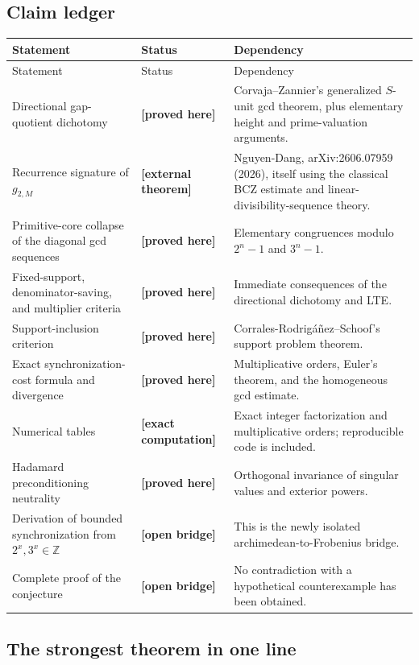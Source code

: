 \documentclass[11pt,oneside]{article}
\theoremstyle{definition}
\theoremstyle{remark}
\newcommand{\Z}{\mathbb Z}
\newcommand{\statusproved}{\textcolor{proofgreen}{\textbf{[proved here]}}}
\newcommand{\statusexternal}{\textcolor{deepblue}{\textbf{[external theorem]}}}
\newcommand{\statuscomputed}{\textcolor{computeviolet}{\textbf{[exact computation]}}}
\newcommand{\statusopen}{\textcolor{openred}{\textbf{[open bridge]}}}
\begin{document}
\subsection{Claim ledger}

\begin{longtable}{@{}p{}p{}p{}@{}}
\toprule
Statement & Status & Dependency \\
\midrule
\endfirsthead
\toprule
Statement & Status & Dependency \\
\midrule
\endhead
Directional gap-quotient dichotomy & \statusproved & Corvaja--Zannier's generalized
$S$-unit gcd theorem, plus elementary height and prime-valuation arguments. \\
Recurrence signature of $g_{2,M}$ & \statusexternal & Nguyen-Dang, arXiv:2606.07959
(2026), itself using the classical BCZ estimate and linear-divisibility-sequence theory. \\
Primitive-core collapse of the diagonal gcd sequences & \statusproved & Elementary
congruences modulo $2^n-1$ and $3^n-1$. \\
Fixed-support, denominator-saving, and multiplier criteria & \statusproved & Immediate
consequences of the directional dichotomy and LTE. \\
Support-inclusion criterion & \statusproved & Corrales-Rodrig\'a\~nez--Schoof's support
problem theorem. \\
Exact synchronization-cost formula and divergence & \statusproved & Multiplicative
orders, Euler's theorem, and the homogeneous gcd estimate. \\
Numerical tables & \statuscomputed & Exact integer factorization and multiplicative orders;
reproducible code is included. \\
Hadamard preconditioning neutrality & \statusproved & Orthogonal invariance of singular
values and exterior powers. \\
Derivation of bounded synchronization from $2^x,3^x\in\Z$ & \statusopen & This is the
newly isolated archimedean-to-Frobenius bridge. \\
Complete proof of the conjecture & \statusopen & No contradiction with a hypothetical
counterexample has been obtained. \\
\bottomrule
\end{longtable}

\subsection{The strongest theorem in one line}
\end{document}
